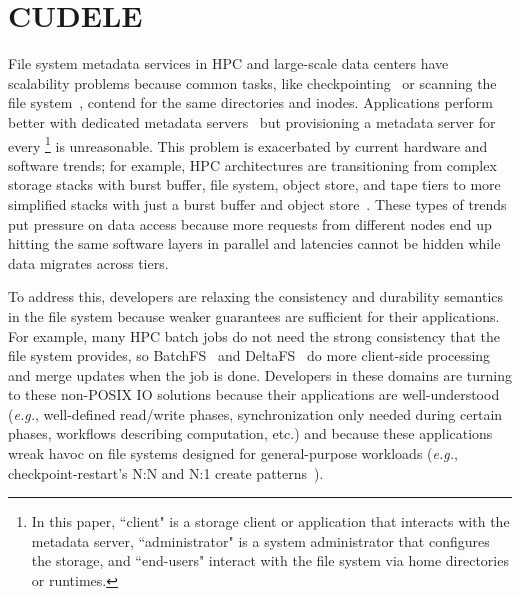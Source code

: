 \chapter{CUDELE}

File system metadata services in HPC and large-scale data centers have
scalability problems because common tasks, like
checkpointing~\cite{bent_plfs_2009} or scanning the file
system~\cite{zheng:pdsw2014-batchfs}, contend for the same directories and
inodes. Applications perform better with dedicated metadata
servers~\cite{sevilla:sc15-mantle, ren:sc2014-indexfs} but provisioning a
metadata server for every \footnote{In this paper, ``client"
is a storage client or application that interacts with the metadata server,
``administrator" is a system administrator that configures the storage, and
``end-users" interact with the file system via home directories or runtimes.  }
is unreasonable. This problem is exacerbated by current hardware and software
trends; for example,  HPC architectures are transitioning from complex storage
stacks with burst buffer, file system, object store, and tape tiers to more
simplified stacks with just a burst buffer and object
store~\cite{bent:login16-hpc-trends}. These types of trends put pressure on
data access because more requests from different nodes end up hitting the same
software layers in parallel and latencies cannot be hidden while data migrates
across tiers.

To address this, developers are relaxing the consistency and durability
semantics in the file system because weaker guarantees are sufficient for their
applications. For example, many HPC batch jobs do not need the strong
consistency that the file system provides, so
BatchFS~\cite{zheng:pdsw2014-batchfs} and DeltaFS~\cite{zheng:pdsw2015-deltafs}
do more client-side processing and merge updates when the job is done.
Developers in these domains are turning to these non-POSIX IO solutions because
their applications are well-understood ({\it e.g.}, well-defined read/write
phases, synchronization only needed during certain phases, workflows describing
computation, etc.) and because these applications wreak havoc on file systems
designed for general-purpose workloads ({\it e.g.}, checkpoint-restart's N:N
and N:1 create patterns~\cite{bent_plfs_2009}).

